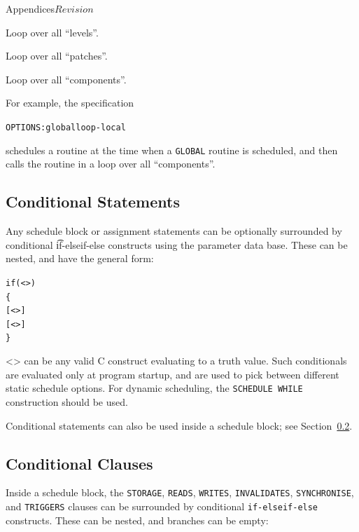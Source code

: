 \begin{cactuspart}{Appendices}{}{$Revision$}
\begin{Lentry}
\item[{\tt LOOP-LEVEL}] Loop over all ``levels''.
  
\item[{\tt LOOP-SINGLEMAP}] Loop over all ``patches''.
  
\item[{\tt LOOP-LOCAL}] Loop over all ``components''.

\end{Lentry}

For example, the specification
\begin{alltt}
  OPTIONS: global loop-local
\end{alltt}
schedules a routine at the time when a \texttt{GLOBAL} routine is
scheduled, and then calls the routine in a loop over all
``components''.


\subsection{Conditional Statements}

Any schedule block or assignment statements can be optionally
surrounded by conditional {\t if-elseif-else}
constructs using the parameter data base. These can be nested,
and have the general form:

\begin{alltt}
if (<>)
\{
  [<>]
  [<>]
\}\end{alltt}

<> can be any valid C construct evaluating
to a truth value.
Such conditionals are evaluated only at program startup, and are used
to pick between different static schedule options.  For dynamic
scheduling, the {\tt SCHEDULE WHILE} construction should be used.

Conditional statements can also be used inside a schedule block; see
Section~\ref{sec:Appendix.schedule.conditional-clauses}.

\subsection{Conditional Clauses}
\label{sec:Appendix.schedule.conditional-clauses}

Inside a schedule block, the {\tt STORAGE}, {\tt READS}, {\tt WRITES},
{\tt INVALIDATES}, {\tt SYNCHRONISE}, and {\tt TRIGGERS} clauses can be
surrounded by conditional {\tt if-elseif-else} constructs. These can be
nested, and branches can be empty:


\end{cactuspart}
